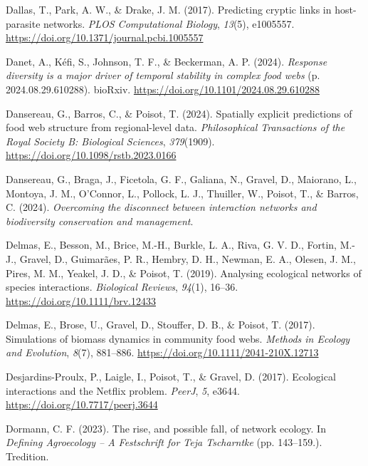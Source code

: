 \documentclass[
]{article}
\newlength{\cslhangindent}
\newenvironment{CSLReferences}[2] %
 {\begin{list}{}{%
  \setlength{\itemindent}{0pt}
  \setlength{\leftmargin}{0pt}
  \setlength{\parsep}{0pt}
  \ifodd #1
   \setlength{\leftmargin}{\cslhangindent}
   \setlength{\itemindent}{-1\cslhangindent}
  \fi
  \setlength{\itemsep}{#2\baselineskip}}}
 {\end{list}}
\begin{document}
\begin{CSLReferences}{1}{0}
Dallas, T., Park, A. W., \& Drake, J. M. (2017). Predicting cryptic
links in host-parasite networks. \emph{PLOS Computational Biology},
\emph{13}(5), e1005557.
\url{https://doi.org/10.1371/journal.pcbi.1005557}

Danet, A., Kéfi, S., Johnson, T. F., \& Beckerman, A. P. (2024).
\emph{Response diversity is a major driver of temporal stability in
complex food webs} (p. 2024.08.29.610288). bioRxiv.
\url{https://doi.org/10.1101/2024.08.29.610288}

Dansereau, G., Barros, C., \& Poisot, T. (2024). Spatially explicit
predictions of food web structure from regional-level data.
\emph{Philosophical Transactions of the Royal Society B: Biological
Sciences}, \emph{379}(1909).
\url{https://doi.org/10.1098/rstb.2023.0166}

Dansereau, G., Braga, J., Ficetola, G. F., Galiana, N., Gravel, D.,
Maiorano, L., Montoya, J. M., O'Connor, L., Pollock, L. J., Thuiller,
W., Poisot, T., \& Barros, C. (2024). \emph{Overcoming the disconnect
between interaction networks and biodiversity conservation and
management}.

Delmas, E., Besson, M., Brice, M.-H., Burkle, L. A., Riva, G. V. D.,
Fortin, M.-J., Gravel, D., Guimarães, P. R., Hembry, D. H., Newman, E.
A., Olesen, J. M., Pires, M. M., Yeakel, J. D., \& Poisot, T. (2019).
Analysing ecological networks of species interactions. \emph{Biological
Reviews}, \emph{94}(1), 16--36. \url{https://doi.org/10.1111/brv.12433}

Delmas, E., Brose, U., Gravel, D., Stouffer, D. B., \& Poisot, T.
(2017). Simulations of biomass dynamics in community food webs.
\emph{Methods in Ecology and Evolution}, \emph{8}(7), 881--886.
\url{https://doi.org/10.1111/2041-210X.12713}

Desjardins-Proulx, P., Laigle, I., Poisot, T., \& Gravel, D. (2017).
Ecological interactions and the {Netflix} problem. \emph{PeerJ},
\emph{5}, e3644. \url{https://doi.org/10.7717/peerj.3644}

Dormann, C. F. (2023). The rise, and possible fall, of network ecology.
In \emph{Defining {Agroecology} -- {A Festschrift} for {Teja
Tscharntke}} (pp. 143--159.). Tredition.


\end{CSLReferences}
\end{document}
